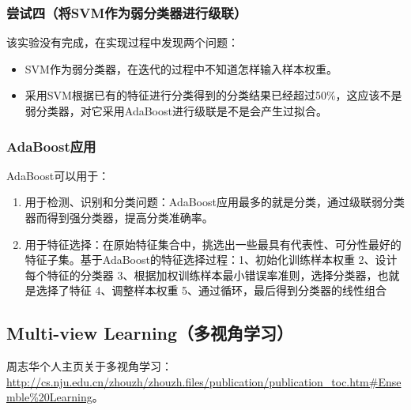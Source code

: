 \subsubsection{尝试四（将SVM作为弱分类器进行级联）}
该实验没有完成，在实现过程中发现两个问题：
\begin{itemize}
\item SVM作为弱分类器，在迭代的过程中不知道怎样输入样本权重。
\item 采用SVM根据已有的特征进行分类得到的分类结果已经超过50\%，这应该不是弱分类器，对它采用AdaBoost进行级联是不是会产生过拟合。
\end{itemize}



\subsubsection{AdaBoost应用}
AdaBoost可以用于：
\begin{enumerate}
\item 用于检测、识别和分类问题：AdaBoost应用最多的就是分类，通过级联弱分类器而得到强分类器，提高分类准确率。
\item 用于特征选择：在原始特征集合中，挑选出一些最具有代表性、可分性最好的特征子集。基于AdaBoost的特征选择过程：1、初始化训练样本权重 2、设计每个特征的分类器 3、根据加权训练样本最小错误率准则，选择分类器，也就是选择了特征 4、调整样本权重 5、通过循环，最后得到分类器的线性组合
\end{enumerate}


\subsection{Multi-view Learning（多视角学习）}
周志华个人主页关于多视角学习：\url{http://cs.nju.edu.cn/zhouzh/zhouzh.files/publication/publication_toc.htm#Ensemble\%20Learning}。

